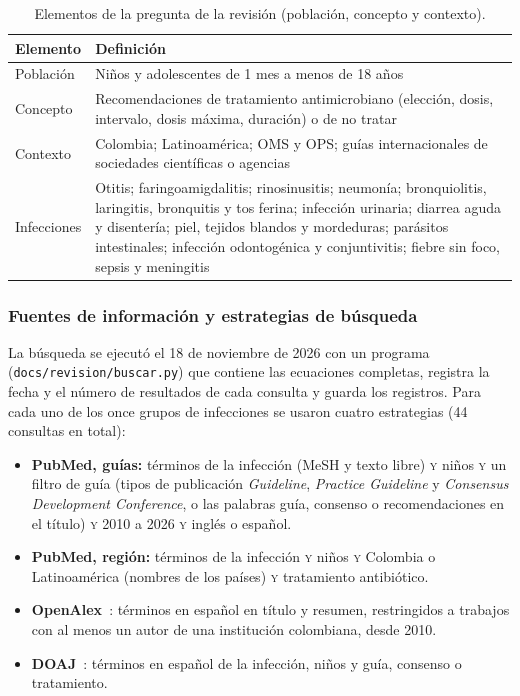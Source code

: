 \documentclass[11pt,a4paper]{article}
\newcommand{\codigo}[1]{\texttt{\small #1}}
\begin{document}
\begin{table}[htbp]
\centering
\caption{Elementos de la pregunta de la revisión (población, concepto y contexto).}
\label{tab:pcc}
\small
\begin{tabularx}{\textwidth}{@{}lX@{}}
\toprule
Elemento & Definición \\
\midrule
Población & Niños y adolescentes de 1 mes a menos de 18 años \\
Concepto & Recomendaciones de tratamiento antimicrobiano (elección, dosis, intervalo, dosis máxima, duración) o de no tratar \\
Contexto & Colombia; Latinoamérica; OMS y OPS; guías internacionales de sociedades científicas o agencias \\
Infecciones & Otitis; faringoamigdalitis; rinosinusitis; neumonía; bronquiolitis, laringitis, bronquitis y tos ferina; infección urinaria; diarrea aguda y disentería; piel, tejidos blandos y mordeduras; parásitos intestinales; infección odontogénica y conjuntivitis; fiebre sin foco, sepsis y meningitis \\
\bottomrule
\end{tabularx}
\end{table}

\subsubsection{Fuentes de información y estrategias de búsqueda}

La búsqueda se ejecutó el 18 de noviembre de 2026 con un programa (\codigo{docs/revision/buscar.py}) que contiene las ecuaciones completas, registra la fecha y el número de resultados de cada consulta y guarda los registros. Para cada uno de los once grupos de infecciones se usaron cuatro estrategias (44 consultas en total):

\begin{itemize}
  \item \textbf{PubMed, guías:} términos de la infección (MeSH y texto libre) \textsc{y} niños \textsc{y} un filtro de guía (tipos de publicación \emph{Guideline}, \emph{Practice Guideline} y \emph{Consensus Development Conference}, o las palabras guía, consenso o recomendaciones en el título) \textsc{y} 2010 a 2026 \textsc{y} inglés o español.
  \item \textbf{PubMed, región:} términos de la infección \textsc{y} niños \textsc{y} Colombia o Latinoamérica (nombres de los países) \textsc{y} tratamiento antibiótico.
  \item \textbf{OpenAlex}~\citep{openalex}: términos en español en título y resumen, restringidos a trabajos con al menos un autor de una institución colombiana, desde 2010.
  \item \textbf{DOAJ}~\citep{doaj}: términos en español de la infección, niños y guía, consenso o tratamiento.
\end{itemize}
\end{document}
